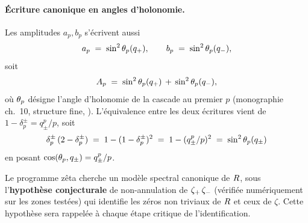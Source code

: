 \paragraph{Écriture canonique en angles d'holonomie.}
Les amplitudes $a_p, b_p$ s'écrivent aussi
\begin{equation}
a_p \;=\; \sin^{2}\theta_{p}(q_{+}), \qquad b_p \;=\; \sin^{2}\theta_{p}(q_{-}),
\label{eq:apbp_sinp}
\end{equation}
soit
\begin{equation}
A_p \;=\; \sin^{2}\theta_{p}(q_{+}) \,+\, \sin^{2}\theta_{p}(q_{-}),
\label{eq:Ap_holonomie}
\end{equation}
où $\theta_{p}$ désigne l'angle d'holonomie de la cascade au premier $p$
(monographie ch.~10, structure fine, \cite{PT_Foundations}). L'équivalence
entre les deux écritures vient de $1 - \delta_p^{\pm} = q_{\pm}^{p}/p$,
soit
\[
\delta_p^{\pm}\,(2 - \delta_p^{\pm}) \;=\; 1 - (1 - \delta_p^{\pm})^{2} \;=\; 1 - (q_{\pm}^{p}/p)^{2} \;=\; \sin^{2}\theta_{p}(q_{\pm})
\]
en posant $\cos(\theta_{p}, q_{\pm}) = q_{\pm}^{p}/p$.

Le programme zêta cherche un modèle spectral canonique de $R$, sous
l'\textbf{hypothèse conjecturale} de non-annulation de
$\zeta_{+}\,\zeta_{-}$ (vérifiée numériquement sur les zones testées) qui
identifie les zéros non triviaux de $R$ et ceux de $\zeta$. Cette
hypothèse sera rappelée à chaque étape critique de l'identification.

